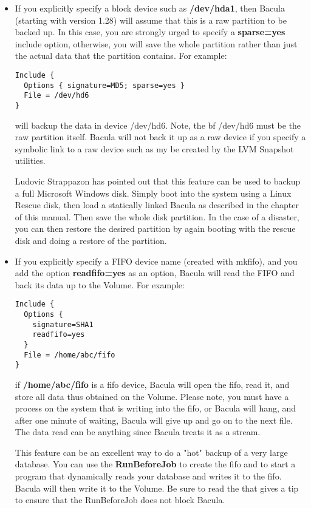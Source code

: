 \begin{itemize}
\item If you explicitly specify a block device such as {\bf /dev/hda1},  then
   Bacula (starting with version 1.28) will assume that this  is a raw partition
   to be backed up. In this case, you are strongly  urged to specify a {\bf
   sparse=yes} include option, otherwise, you  will save the whole partition
   rather than just the actual data that  the partition contains. For example: 

\footnotesize
\begin{verbatim}
Include {
  Options { signature=MD5; sparse=yes }
  File = /dev/hd6
}
\end{verbatim}
\normalsize

   will backup the data in device /dev/hd6. Note, the {bf /dev/hd6} must be
   the raw partition itself. Bacula will not back it up as a raw device if
   you specify a symbolic link to a raw device such as my be created by the
   LVM Snapshot utilities.

   Ludovic Strappazon has pointed out that this feature can be  used to backup a
   full Microsoft Windows disk. Simply boot into  the system using a Linux Rescue
   disk, then load a statically  linked Bacula as described in the 
    chapter of
   this manual. Then  save the whole disk partition. In the case of a disaster,
   you  can then restore the desired partition by again booting with  the rescue
   disk and doing a restore of the partition. 
   \item If you explicitly specify a FIFO device name (created with mkfifo),  and
   you add the option {\bf readfifo=yes} as an option, Bacula  will read the FIFO
   and back its data up to the Volume. For  example: 

\footnotesize
\begin{verbatim}
Include {
  Options {
    signature=SHA1
    readfifo=yes
  }
  File = /home/abc/fifo
}
\end{verbatim}
\normalsize

   if {\bf /home/abc/fifo} is a fifo device, Bacula will open the fifo,
   read it, and store all data thus obtained on the Volume.  Please note,
   you must have a process on the system that is writing into the fifo, or
   Bacula will hang, and after one minute of waiting, Bacula will give up
   and go on to the next file.  The data read can be anything since Bacula
   treats it as a stream.

   This feature can be an excellent way to do a "hot" backup of a very
   large database.  You can use the {\bf RunBeforeJob} to create the fifo
   and to start a program that dynamically reads your database and writes
   it to the fifo.  Bacula will then write it to the Volume.  Be sure to
   read the  that gives a
   tip to ensure that the RunBeforeJob does not block Bacula.


\end{itemize}
